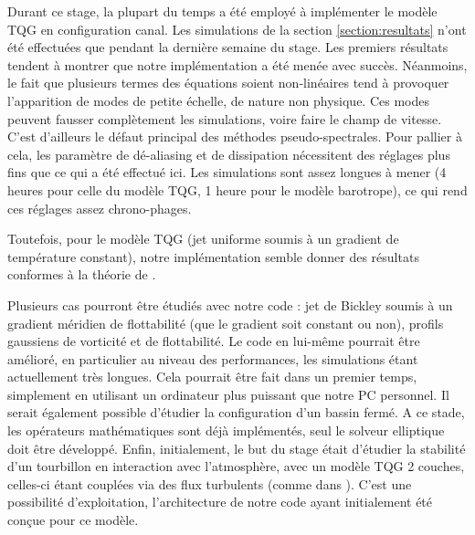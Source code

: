 Durant ce stage, la plupart du temps a été employé à implémenter le modèle TQG en configuration canal. Les simulations de la section \ref{section:resultats} n'ont été effectuées que pendant la dernière semaine du stage. Les premiers résultats tendent à montrer que notre implémentation a été menée avec succès. Néanmoins, le fait que plusieurs termes des équations soient non-linéaires tend à provoquer l'apparition de modes de petite échelle, de nature non physique. Ces modes peuvent fausser complètement les simulations, voire faire  le champ de vitesse. C'est d'ailleurs le défaut principal des méthodes pseudo-spectrales. Pour pallier à cela, les paramètre de dé-aliasing et de dissipation nécessitent des réglages plus fins que ce qui a été effectué ici. Les simulations sont assez longues à mener (4 heures pour celle du modèle TQG, 1 heure pour le modèle barotrope), ce qui rend ces réglages assez chrono-phages. 

Toutefois, pour le modèle TQG (jet uniforme soumis à un gradient de température constant), notre implémentation semble donner des résultats conformes à la théorie de \parencite{Carton2026_JTQG}.

Plusieurs cas pourront être étudiés avec notre code : jet de Bickley soumis à un gradient méridien de flottabilité (que le gradient soit constant ou non), profils gaussiens de vorticité et de flottabilité. Le code en lui-même pourrait être amélioré, en particulier au niveau des performances, les simulations étant actuellement très longues. Cela pourrait être fait dans un premier temps, simplement en utilisant un ordinateur plus puissant que notre PC personnel. Il serait également possible d'étudier la configuration d'un bassin fermé. A ce stade, les opérateurs mathématiques sont déjà implémentés, seul le solveur elliptique doit être développé. Enfin, initialement, le but du stage était d'étudier la stabilité d'un tourbillon en interaction avec l'atmosphère, avec un modèle TQG 2 couches, celles-ci étant couplées via des flux turbulents (comme dans \parencite{Vic2024}). C'est une possibilité d'exploitation, l'architecture de notre code ayant initialement été conçue pour ce modèle. 